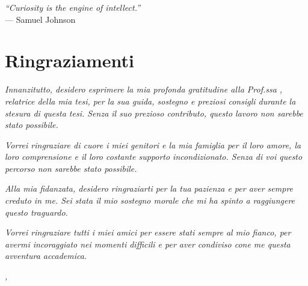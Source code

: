 \cleardoublepage{}

\begin{flushright}{
    \slshape
    ``Curiosity is the engine of intellect.''} \\
    \medskip
    --- Samuel Johnson
\end{flushright}


\bigskip

\begingroup
\let\clearpage\relax
\let\cleardoublepage\relax
\let\cleardoublepage\relax

\chapter*{Ringraziamenti}

\noindent \textit{Innanzitutto, desidero esprimere la mia profonda gratitudine alla Prof.ssa \myProf, relatrice della mia tesi, per la sua guida, sostegno e preziosi consigli durante la stesura di questa tesi. Senza il suo prezioso contributo, questo lavoro non sarebbe stato possibile.\\}

\noindent \textit{Vorrei ringraziare di cuore i miei genitori e la mia famiglia per il loro amore, la loro comprensione e il loro costante supporto incondizionato. Senza di voi questo percorso non sarebbe stato possibile.\\}

\noindent \textit{Alla mia fidanzata, desidero ringraziarti per la tua pazienza e per aver sempre creduto in me. Sei stata il mio sostegno morale che mi ha spinto a raggiungere questo traguardo. \\}

\noindent \textit{Vorrei ringraziare tutti i miei amici per essere stati sempre al mio fianco, per avermi incoraggiato nei momenti difficili e per aver condiviso cone me questa avventura accademica.\\}



\bigskip

\noindent\textit{\myLocation, \myTime}
\hfill \myName\endgroup

